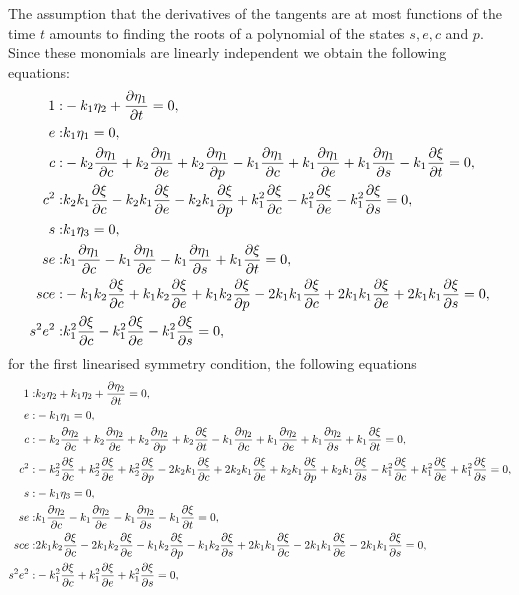 The assumption that the derivatives of the tangents are at most functions of the time $t$ amounts to finding the roots of a polynomial of the states $s,e,c$ and $p$. Since these monomials are linearly independent we obtain the following equations:
\begin{align}
1:&- k_{1} \eta_2 + \pdv{\eta_1}{t}=0,\\
e:&k_{1} \eta_1=0,\\
c:&- k_{2} \pdv{\eta_1}{c} + k_{2} \pdv{\eta_1}{e} + k_{2} \pdv{\eta_1}{p} - k_{1} \pdv{\eta_1}{c} + k_{1} \pdv{\eta_1}{e} + k_{1} \pdv{\eta_1}{s} - k_{1} \pdv{\xi}{t}=0,\\
c^{2}:&k_{2} k_{1} \pdv{\xi}{c} - k_{2} k_{1} \pdv{\xi}{e} - k_{2} k_{1} \pdv{\xi}{p} + k_{1}^{2} \pdv{\xi}{c} - k_{1}^{2} \pdv{\xi}{e} - k_{1}^{2} \pdv{\xi}{s}=0,\\
s:&k_{1} \eta_3=0,\\
s e:&k_{1} \pdv{\eta_1}{c} - k_{1} \pdv{\eta_1}{e} - k_{1} \pdv{\eta_1}{s} + k_{1} \pdv{\xi}{t}=0,\\
s c e:&- k_{1} k_{2} \pdv{\xi}{c} + k_{1} k_{2} \pdv{\xi}{e} + k_{1} k_{2} \pdv{\xi}{p} - 2 k_{1} k_{1} \pdv{\xi}{c} + 2 k_{1} k_{1} \pdv{\xi}{e} + 2 k_{1} k_{1} \pdv{\xi}{s}=0,\\
s^{2} e^{2}:&k_{1}^{2} \pdv{\xi}{c} - k_{1}^{2} \pdv{\xi}{e} - k_{1}^{2} \pdv{\xi}{s}=0,
\end{align}
for the first linearised symmetry condition, the following equations
\begin{align}
1:&k_{2} \eta_2 + k_{1} \eta_2 + \pdv{\eta_2}{t}=0,\\
e:&- k_{1} \eta_1=0,\\
c:&- k_{2} \pdv{\eta_2}{c} + k_{2} \pdv{\eta_2}{e} + k_{2} \pdv{\eta_2}{p} + k_{2} \pdv{\xi}{t} - k_{1} \pdv{\eta_2}{c} + k_{1} \pdv{\eta_2}{e} + k_{1} \pdv{\eta_2}{s} + k_{1} \pdv{\xi}{t}=0,\\
c^{2}:&- k_{2}^{2} \pdv{\xi}{c} + k_{2}^{2} \pdv{\xi}{e} + k_{2}^{2} \pdv{\xi}{p} - 2 k_{2} k_{1} \pdv{\xi}{c} + 2 k_{2} k_{1} \pdv{\xi}{e} + k_{2} k_{1} \pdv{\xi}{p} + k_{2} k_{1} \pdv{\xi}{s} - k_{1}^{2} \pdv{\xi}{c} + k_{1}^{2} \pdv{\xi}{e} + k_{1}^{2} \pdv{\xi}{s}=0,\\
s:&- k_{1} \eta_3=0,\\
s e:&k_{1} \pdv{\eta_2}{c} - k_{1} \pdv{\eta_2}{e} - k_{1} \pdv{\eta_2}{s} - k_{1} \pdv{\xi}{t}=0,\\
s c e:&2 k_{1} k_{2} \pdv{\xi}{c} - 2 k_{1} k_{2} \pdv{\xi}{e} - k_{1} k_{2} \pdv{\xi}{p} - k_{1} k_{2} \pdv{\xi}{s} + 2 k_{1} k_{1} \pdv{\xi}{c} - 2 k_{1} k_{1} \pdv{\xi}{e} - 2 k_{1} k_{1} \pdv{\xi}{s}=0,\\
s^{2} e^{2}:&- k_{1}^{2} \pdv{\xi}{c} + k_{1}^{2} \pdv{\xi}{e} + k_{1}^{2} \pdv{\xi}{s}=0,
\end{align}
